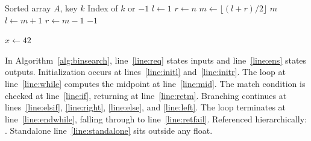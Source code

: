 \documentclass{article}
\begin{document}
\begin{algorithm}
\caption{Binary Search}\label{alg:binsearch}
\begin{algorithmic}[1]
\Require Sorted array $A$, key $k$\label{line:req}
\Ensure Index of $k$ or $-1$\label{line:ens}
\State $l \gets 1$\label{line:initl}
\State $r \gets n$\label{line:initr}
\label{line:while}
  \State $m \gets \lfloor (l + r) / 2 \rfloor$\label{line:mid}
  \label{line:if}
    \State \Return $m$\label{line:retm}
  \label{line:elsif}
    \State $l \gets m + 1$\label{line:right}
  \Else\label{line:else}
    \State $r \gets m - 1$\label{line:left}
  \EndIf\label{line:endif}
\EndWhile\label{line:endwhile}
\State \Return $-1$\label{line:retfail}
\end{algorithmic}
\end{algorithm}

\begin{algorithmic}[1]
\State $x \gets 42$\label{line:standalone}
\end{algorithmic}

In Algorithm~\ref{alg:binsearch}, line~\ref{line:req} states inputs and line~\ref{line:ens} states outputs.
Initialization occurs at lines~\ref{line:initl} and~\ref{line:initr}.
The loop at line~\ref{line:while} computes the midpoint at line~\ref{line:mid}.
The match condition is checked at line~\ref{line:if}, returning at line~\ref{line:retm}.
Branching continues at lines~\ref{line:elsif}, \ref{line:right}, \ref{line:else}, and \ref{line:left}.
The loop terminates at line~\ref{line:endwhile}, falling through to line~\ref{line:retfail}.
Referenced hierarchically: .
Standalone line~\ref{line:standalone} sits outside any float.
\end{document}
